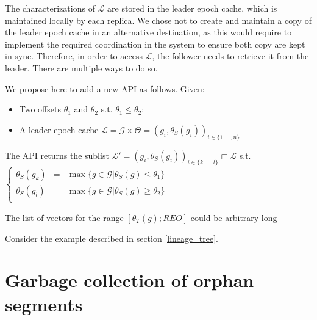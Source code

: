 \documentclass{article}
\begin{document}
The characterizations of $\mathcal{L}$ are stored in the leader epoch cache, which is maintained locally by each replica. We chose not to create and maintain a copy of the leader epoch cache in an alternative destination, as this would require to implement the required coordination in the system to ensure both copy are kept in sync. Therefore, in order to access $\mathcal{L}$, the follower needs to retrieve it from the leader. There are multiple ways to do so.

We propose here to add a new API as follows. Given:

\begin{itemize}
\item Two offsets $\theta_1$ and $\theta_2$ s.t. $\theta_1 \leq \theta_2$;
\item A leader epoch cache $\mathcal{L}=\mathcal{G}\times\Theta=(g_i, \theta_S(g_i))_{i \in \{1,...,n\}}$
\end{itemize}

The API returns the sublist $\mathcal{L'}=(g_i, \theta_S(g_i))_{i \in \{k,...,l\}} \sqsubset \mathcal{L}$ s.t. $\left\{
\begin{array}{rcl}
\theta_S(g_k)&=&\max \{g \in \mathcal{G} | \theta_S(g) \leq \theta_1\}\\
\theta_S(g_l)&=&\max \{g \in \mathcal{G} | \theta_S(g) \geq \theta_2\}\\
\end{array}
\right.$



The list of vectors for the range $[\theta_T(g); REO]$ could be arbitrary long


Consider the example described in section \ref{lineage_tree}. 

\newpage
\section{Garbage collection of orphan segments}

\newpage

{}
\end{document}
